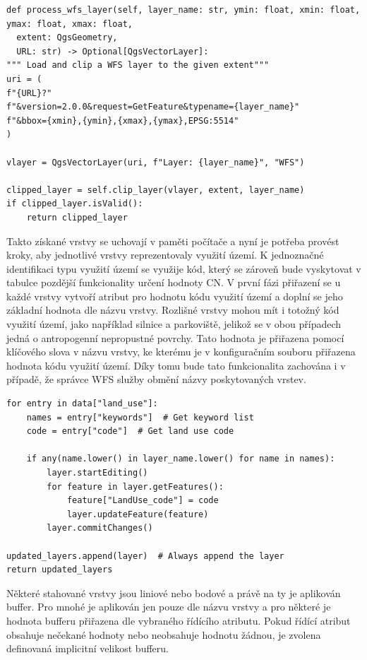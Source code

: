 \documentclass[a4paper,oneside,12pt]{book}
\begin{document}
\begin{lstlisting}[style=mypython, caption={Stažení vrstvy z WFS služby}, label={kod:wfs}]
def process_wfs_layer(self, layer_name: str, ymin: float, xmin: float, ymax: float, xmax: float,
  extent: QgsGeometry,
  URL: str) -> Optional[QgsVectorLayer]:
""" Load and clip a WFS layer to the given extent"""
uri = (
f"{URL}?"
f"&version=2.0.0&request=GetFeature&typename={layer_name}"
f"&bbox={xmin},{ymin},{xmax},{ymax},EPSG:5514"
)

vlayer = QgsVectorLayer(uri, f"Layer: {layer_name}", "WFS")

clipped_layer = self.clip_layer(vlayer, extent, layer_name)
if clipped_layer.isValid():
	return clipped_layer
\end{lstlisting}
\hspace{10mm}Takto získané vrstvy se uchovají v paměti počítače a nyní je potřeba provést kroky, aby jednotlivé vrstvy reprezentovaly využití území. K jednoznačné identifikaci typu využití území se využije kód, který se zároveň bude vyskytovat v tabulce pozdější funkcionality určení hodnoty CN. V první fázi přiřazení se u každé vrstvy vytvoří atribut pro hodnotu kódu využití území a doplní se jeho základní hodnota dle názvu vrstvy. Rozlišné vrstvy mohou mít i totožný kód využití území, jako například silnice a parkoviště, jelikož se v obou případech jedná o antropogenní nepropustné povrchy. Tato hodnota je přiřazena pomocí klíčového slova v názvu vrstvy, ke kterému je v konfiguračním souboru přiřazena hodnota kódu využití území. Díky tomu bude tato funkcionalita zachována i v případě, že správce WFS služby obmění názvy poskytovaných vrstev.

\begin{lstlisting}[style=mypython, caption={Přiřazení kódu využití území}, label={kod:landusecode}]
for entry in data["land_use"]:
    names = entry["keywords"]  # Get keyword list
    code = entry["code"]  # Get land use code

    if any(name.lower() in layer_name.lower() for name in names):
        layer.startEditing()
        for feature in layer.getFeatures():
            feature["LandUse_code"] = code
            layer.updateFeature(feature)
        layer.commitChanges()

updated_layers.append(layer)  # Always append the layer
return updated_layers
\end{lstlisting}

\hspace{10mm}Některé stahované vrstvy jsou liniové nebo bodové a právě na ty je aplikován buffer. Pro mnohé je aplikován jen pouze dle názvu vrstvy a pro některé je hodnota bufferu přiřazena dle vybraného řídícího atributu. Pokud řídící atribut obsahuje nečekané hodnoty nebo neobsahuje hodnotu žádnou, je zvolena definovaná implicitní velikost bufferu.
\end{document}
